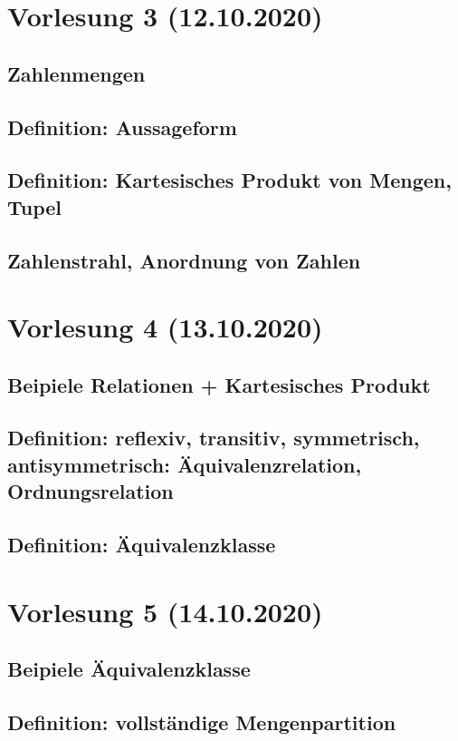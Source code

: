 \documentclass[]{article}
\begin{document}
\section{Vorlesung 3 (12.10.2020)}
\subsection{Zahlenmengen}
\subsection{Definition: Aussageform}
\subsection{Definition: Kartesisches Produkt von Mengen, Tupel}
\subsection{Zahlenstrahl, Anordnung von Zahlen}


\section{Vorlesung 4 (13.10.2020)}
\subsection{Beipiele Relationen + Kartesisches Produkt}
\subsection{Definition: reflexiv, transitiv, symmetrisch, antisymmetrisch: Äquivalenzrelation, Ordnungsrelation}
\subsection{Definition: Äquivalenzklasse}


\section{Vorlesung 5 (14.10.2020)}
\subsection{Beipiele Äquivalenzklasse}
\subsection{Definition: vollständige Mengenpartition}
\end{document}
